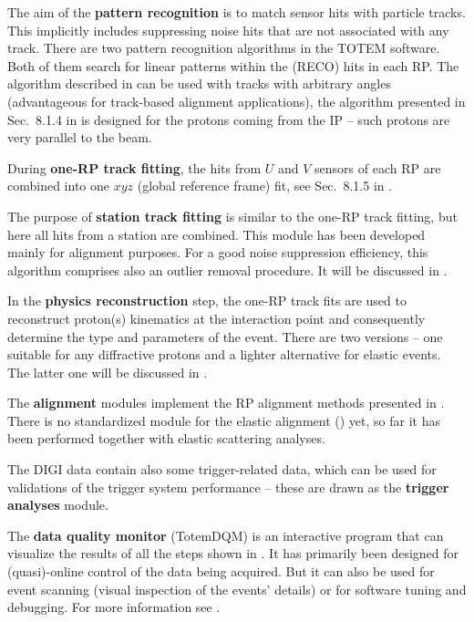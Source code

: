 \> The aim of the {\bf pattern recognition} is to match sensor hits with particle tracks. This implicitly includes suppressing noise hits that are not associated with any track. There are two pattern recognition algorithms in the TOTEM software. Both of them search for linear patterns within the (RECO) hits in each RP. The algorithm described in  can be used with tracks with arbitrary angles (advantageous for track-based alignment applications), the algorithm presented in Sec.~8.1.4 in  is designed for the protons coming from the IP -- such protons are very parallel to the beam.

\> During {\bf one-RP track fitting}, the hits from $U$ and $V$ sensors of each RP are combined into one $xyz$ (global reference frame) fit, see Sec.~8.1.5 in .

\> The purpose of {\bf station track fitting} is similar to the one-RP track fitting, but here all hits from a station are combined. This module has been developed mainly for alignment purposes. For a good noise suppression efficiency, this algorithm comprises also an outlier removal procedure. It will be discussed in .

\> In the {\bf physics reconstruction} step, the one-RP track fits are used to reconstruct proton(s) kinematics at the interaction point and consequently determine the type and parameters of the event. There are two versions -- one suitable for any diffractive protons and a lighter alternative for elastic events. The latter one will be discussed in .

\> The {\bf alignment} modules implement the RP alignment methods presented in . There is no standardized module for the elastic alignment () yet, so far it has been performed together with elastic scattering analyses.

\> The DIGI data contain also some trigger-related data, which can be used for validations of the trigger system performance -- these are drawn as the {\bf trigger analyses} module.

\> The {\bf data quality monitor} (TotemDQM) is an interactive program that can visualize the results of all the steps shown in . It has primarily been designed for (quasi)-online control of the data being acquired. But it can also be used for event scanning (visual inspection of the events' details) or for software tuning and debugging. For more information see .




